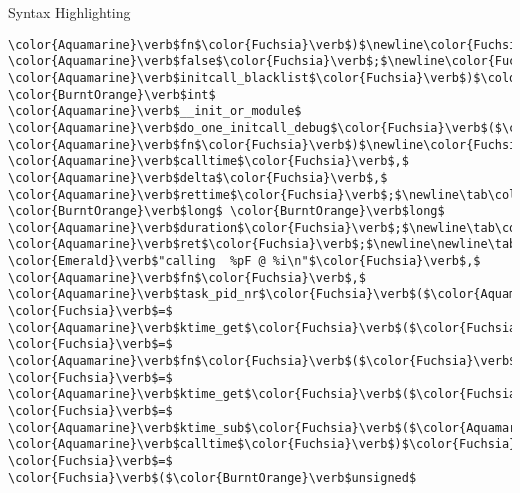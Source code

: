 \begin{frame}{Syntax Highlighting}
\begin{verbatim}
\color{Aquamarine}\verb$fn$\color{Fuchsia}\verb$)$\newline\color{Fuchsia}\verb${$\newline\tab\color{BurntOrange}\verb$return$ \color{Aquamarine}\verb$false$\color{Fuchsia}\verb$;$\newline\color{Fuchsia}\verb$}$\newline\color{Gray}\verb$#endif$\newline\color{Aquamarine}\verb$__setup$\color{Fuchsia}\verb$($\color{Emerald}\verb$"initcall_blacklist="$\color{Fuchsia}\verb$,$ \color{Aquamarine}\verb$initcall_blacklist$\color{Fuchsia}\verb$)$\color{Fuchsia}\verb$;$\newline\newline\color{BurntOrange}\verb$static$ \color{BurntOrange}\verb$int$ \color{Aquamarine}\verb$__init_or_module$ \color{Aquamarine}\verb$do_one_initcall_debug$\color{Fuchsia}\verb$($\color{Aquamarine}\verb$initcall_t$ \color{Aquamarine}\verb$fn$\color{Fuchsia}\verb$)$\newline\color{Fuchsia}\verb${$\newline\tab\color{Aquamarine}\verb$ktime_t$ \color{Aquamarine}\verb$calltime$\color{Fuchsia}\verb$,$ \color{Aquamarine}\verb$delta$\color{Fuchsia}\verb$,$ \color{Aquamarine}\verb$rettime$\color{Fuchsia}\verb$;$\newline\tab\color{BurntOrange}\verb$unsigned$ \color{BurntOrange}\verb$long$ \color{BurntOrange}\verb$long$ \color{Aquamarine}\verb$duration$\color{Fuchsia}\verb$;$\newline\tab\color{BurntOrange}\verb$int$ \color{Aquamarine}\verb$ret$\color{Fuchsia}\verb$;$\newline\newline\tab\color{Aquamarine}\verb$printk$\color{Fuchsia}\verb$($\color{Aquamarine}\verb$KERN_DEBUG$ \color{Emerald}\verb$"calling  %pF @ %i\n"$\color{Fuchsia}\verb$,$ \color{Aquamarine}\verb$fn$\color{Fuchsia}\verb$,$ \color{Aquamarine}\verb$task_pid_nr$\color{Fuchsia}\verb$($\color{Aquamarine}\verb$current$\color{Fuchsia}\verb$)$\color{Fuchsia}\verb$)$\color{Fuchsia}\verb$;$\newline\tab\color{Aquamarine}\verb$calltime$ \color{Fuchsia}\verb$=$ \color{Aquamarine}\verb$ktime_get$\color{Fuchsia}\verb$($\color{Fuchsia}\verb$)$\color{Fuchsia}\verb$;$\newline\tab\color{Aquamarine}\verb$ret$ \color{Fuchsia}\verb$=$ \color{Aquamarine}\verb$fn$\color{Fuchsia}\verb$($\color{Fuchsia}\verb$)$\color{Fuchsia}\verb$;$\newline\tab\color{Aquamarine}\verb$rettime$ \color{Fuchsia}\verb$=$ \color{Aquamarine}\verb$ktime_get$\color{Fuchsia}\verb$($\color{Fuchsia}\verb$)$\color{Fuchsia}\verb$;$\newline\tab\color{Aquamarine}\verb$delta$ \color{Fuchsia}\verb$=$ \color{Aquamarine}\verb$ktime_sub$\color{Fuchsia}\verb$($\color{Aquamarine}\verb$rettime$\color{Fuchsia}\verb$,$ \color{Aquamarine}\verb$calltime$\color{Fuchsia}\verb$)$\color{Fuchsia}\verb$;$\newline\tab\color{Aquamarine}\verb$duration$ \color{Fuchsia}\verb$=$ \color{Fuchsia}\verb$($\color{BurntOrange}\verb$unsigned$ 
\end{verbatim}
\end{frame}
